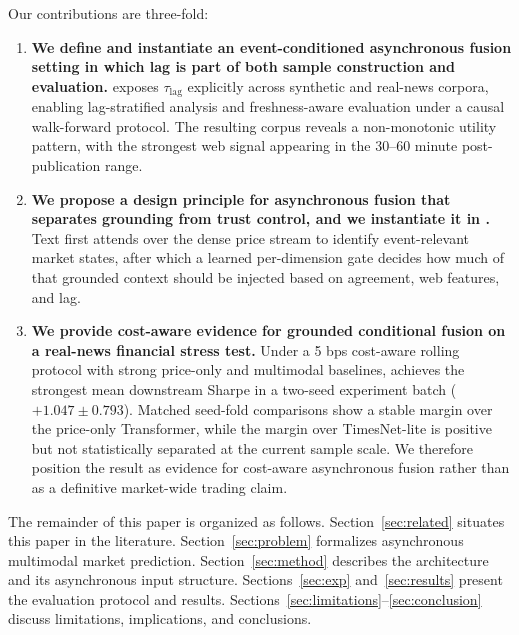 Our contributions are three-fold:
\begin{enumerate}
  \item \textbf{We define and instantiate an event-conditioned asynchronous fusion setting in which lag is part of both sample construction and evaluation.}
  \dataset{} exposes $\tau_{\mathrm{lag}}$ explicitly across synthetic and real-news corpora, enabling lag-stratified analysis and freshness-aware evaluation under a causal walk-forward protocol.
  The resulting corpus reveals a non-monotonic utility pattern, with the strongest web signal appearing in the 30--60 minute post-publication range.
  \item \textbf{We propose a design principle for asynchronous fusion that separates grounding from trust control, and we instantiate it in \CGCMA{}.}
  Text first attends over the dense price stream to identify event-relevant market states, after which a learned per-dimension gate decides how much of that grounded context should be injected based on agreement, web features, and lag.
  \item \textbf{We provide cost-aware evidence for grounded conditional fusion on a real-news financial stress test.}
  Under a 5 bps cost-aware rolling protocol with strong price-only and multimodal baselines, \CGCMA{} achieves the strongest mean downstream Sharpe in a two-seed experiment batch ($+1.047\pm0.793$).
  Matched seed-fold comparisons show a stable margin over the price-only Transformer, while the margin over TimesNet-lite is positive but not statistically separated at the current sample scale.
  We therefore position the result as evidence for cost-aware asynchronous fusion rather than as a definitive market-wide trading claim.
\end{enumerate}

The remainder of this paper is organized as follows.
Section~\ref{sec:related} situates this paper in the literature.
Section~\ref{sec:problem} formalizes asynchronous multimodal market prediction.
Section~\ref{sec:method} describes the \CGCMA{} architecture and its asynchronous input structure.
Sections~\ref{sec:exp} and~\ref{sec:results} present the evaluation protocol and results.
Sections~\ref{sec:limitations}--\ref{sec:conclusion} discuss limitations, implications, and conclusions.
